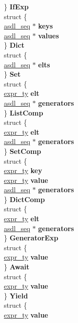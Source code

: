 \begin{DoxyCompactItemize}
\begin{tabbing}
\>\} {\bfseries IfExp}\\
\>struct \{\\
\>\>\hyperlink{structasdl__seq}{asdl\_seq} $\ast$ {\bfseries keys}\\
\>\>\hyperlink{structasdl__seq}{asdl\_seq} $\ast$ {\bfseries values}\\
\>\} {\bfseries Dict}\\
\>struct \{\\
\>\>\hyperlink{structasdl__seq}{asdl\_seq} $\ast$ {\bfseries elts}\\
\>\} {\bfseries Set}\\
\>struct \{\\
\>\>\hyperlink{struct__expr}{expr\_ty} {\bfseries elt}\\
\>\>\hyperlink{structasdl__seq}{asdl\_seq} $\ast$ {\bfseries generators}\\
\>\} {\bfseries ListComp}\\
\>struct \{\\
\>\>\hyperlink{struct__expr}{expr\_ty} {\bfseries elt}\\
\>\>\hyperlink{structasdl__seq}{asdl\_seq} $\ast$ {\bfseries generators}\\
\>\} {\bfseries SetComp}\\
\>struct \{\\
\>\>\hyperlink{struct__expr}{expr\_ty} {\bfseries key}\\
\>\>\hyperlink{struct__expr}{expr\_ty} {\bfseries value}\\
\>\>\hyperlink{structasdl__seq}{asdl\_seq} $\ast$ {\bfseries generators}\\
\>\} {\bfseries DictComp}\\
\>struct \{\\
\>\>\hyperlink{struct__expr}{expr\_ty} {\bfseries elt}\\
\>\>\hyperlink{structasdl__seq}{asdl\_seq} $\ast$ {\bfseries generators}\\
\>\} {\bfseries GeneratorExp}\\
\>struct \{\\
\>\>\hyperlink{struct__expr}{expr\_ty} {\bfseries value}\\
\>\} {\bfseries Await}\\
\>struct \{\\
\>\>\hyperlink{struct__expr}{expr\_ty} {\bfseries value}\\
\>\} {\bfseries Yield}\\
\>struct \{\\
\>\>\hyperlink{struct__expr}{expr\_ty} {\bfseries value}\\

\end{tabbing}
\end{DoxyCompactItemize}
